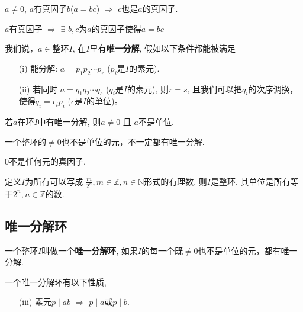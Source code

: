 \begin{Corollary}
$a\neq 0$, $a$有真因子$b$\;($a = bc$) $\Rightarrow$ $c$也是$a$的真因子.
\end{Corollary}

\begin{Note}
$a$有真因子 $\Rightarrow$ $\exists$ $b, c$为$a$的真因子使得$a = bc$
\end{Note}

\begin{Definition}[唯一分解]
我们说，$a \in $整环$I$, 在$I$里有\textbf{唯一分解}, 假如以下条件都能被满足
\begin{enumerate}[(1)]
	\item[(i)] 能分解: $a = p_1 p_2 \cdots p_r$ ($p_i$是$I$的素元).
	\item[(ii)] 若同时 $a = q_1 q_2 \cdots q_s$ ($q_i$是$I$的素元), 则$r=s$, 且我们可以把$q_i$的次序调换，使得$q_i = \epsilon_i p_i$ ($\epsilon$是$I$的单位)。
\end{enumerate}
\end{Definition}

\begin{Note}
若$a$在环$I$中有唯一分解, 则$a \neq \mathfrak{0}$ 且 $a$不是单位.
\end{Note}

\begin{Note}
一个整环的$\neq \mathfrak{0}$也不是单位的元，不一定都有唯一分解.
\end{Note}

\begin{Proposition}
$\mathfrak{0}$不是任何元的真因子.
\end{Proposition}

\begin{Proposition}
定义$I$为所有可以写成 $\displaystyle \frac{m}{2^n}, m \in \mathbb{Z}, n \in \mathbb{N}$形式的有理数, 则$I$是整环, 其单位是所有等于$2^n, n \in \mathbb{Z}$的数.
\end{Proposition}

\subsection{唯一分解环} %

\begin{Definition}[唯一分解环]
一个整环$I$叫做一个\textbf{唯一分解环}, 如果$I$的每一个既$\neq \mathfrak{0}$也不是单位的元，都有唯一分解.
\end{Definition}

\begin{Theorem}
一个唯一分解环有以下性质, 
\begin{itemize}
	\item[(iii)] 素元$p \mid ab$ $\Rightarrow$ $p \mid a$或$p \mid b$.
\end{itemize}
\end{Theorem}


